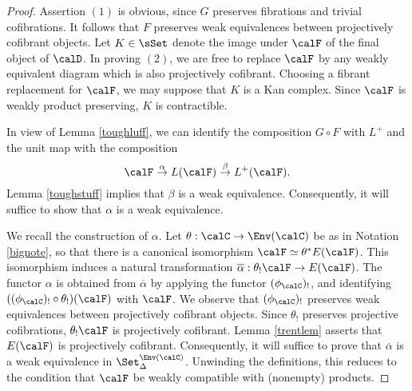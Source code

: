 \begin{proof}
Assertion $(1)$ is obvious, since $G$ preserves fibrations and trivial cofibrations.
It follows that $F$ preserves weak equivalences between projectively cofibrant objects. 
Let $K \in \sSet$ denote the image under $\calF$ of the final object of $\calD$. 
In proving $(2)$, we are free to replace $\calF$ by any weakly equivalent diagram which is also projectively cofibrant. Choosing a fibrant replacement for $\calF$, we may suppose that $K$ is a Kan complex. Since $\calF$ is weakly product preserving, $K$ is contractible.

In view of Lemma \ref{toughluff}, we can identify the composition $G \circ F$ with $L^{+}$ and the unit map with the composition
$$ \calF \stackrel{\alpha}{\rightarrow} L(\calF) \stackrel{\beta}{\rightarrow} L^{+}(\calF).$$
Lemma \ref{toughstuff} implies that $\beta$ is a weak equivalence. Consequently, it will suffice to show that $\alpha$ is a weak equivalence.

We recall the construction of $\alpha$. Let $\theta: \calC \rightarrow \Env(\calC)$ be as in Notation \ref{bignote}, so that there is a canonical isomorphism $\calF \simeq \theta^{\ast} E(\calF)$. This
isomorphism induces a natural transformation $\overline{\alpha}: \theta_{!} \calF \rightarrow E(\calF)$. The functor $\alpha$ is obtained from $\overline{\alpha}$ by applying the functor
$(\phi_{\calC})_{!}$, and identifying $((\phi_{\calC})_{!} \circ \theta_{!} )(\calF)$ with $\calF$. 
We observe that $(\phi_{\calC})_{!}$ preserves weak equivalences between projectively cofibrant objects. Since $\theta_{!}$ preserves projective cofibrations, $\theta_{!} \calF$ is projectively cofibrant. Lemma \ref{trentlem} asserts that $E(\calF)$ is projectively cofibrant. Consequently, it will suffice to prove that $\overline{\alpha}$ is a weak equivalence in $\Set_{\Delta}^{\Env(\calC)}$. Unwinding the definitions, this reduces to the condition that $\calF$ be weakly compatible with (nonempty) products.
\end{proof}

